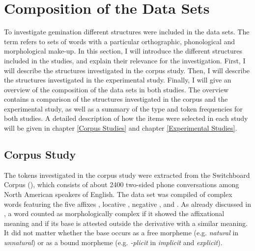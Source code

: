 \section{Composition of the Data Sets} \label{General Method Data Sets}

To investigate gemination different structures were included in the data sets. The term  refers to sets of words with a particular orthographic, phonological and morphological make-up. In this section, I will introduce the different structures included in the studies, and explain their relevance for the investigation.
 First, I will describe the structures investigated in the corpus study. Then, I will describe the structures investigated in the experimental study. Finally, I will give an overview of the composition of the data sets in both studies. The overview contains a comparison of the structures investigated in the corpus and the experimental study, as well as a summary of the type and token frequencies for both studies. A detailed description of how the items were selected in each study will be given in chapter \ref{Corpus Studies} and chapter \ref{Experimental Studies}.


\subsection{Corpus Study}\label{corpus data composition}

The tokens investigated in the corpus study were extracted from the Switchboard Corpus (\citealt{Godfrey.1997}), which consists of about 2400 two-sided phone conversations among North American speakers of English.  The data set was compiled of complex words featuring the five affixes , locative , negative ,  and . As already discussed in ,  a word counted as morphologically complex if it showed the affixational meaning and if its base is attested outside the derivative with a similar meaning. It did not matter whether the base occurs as a free morpheme (e.g. \textit{natural} in \textit{unnatural}) or as a bound morpheme (e.g. \textit{-plicit} in \textit{implicit}  and  \textit{explicit}). 


